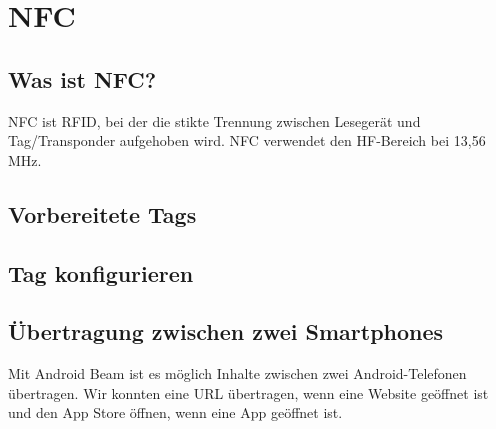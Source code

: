 \documentclass[a4paper,12pt,headsepline,footsepline]{scrartcl}
\begin{document}
\section{NFC}

\subsection{Was ist NFC?}

NFC ist RFID, bei der die stikte Trennung zwischen Lesegerät und Tag/Transponder aufgehoben wird.
NFC verwendet den HF-Bereich bei 13,56 MHz.

\subsection{Vorbereitete Tags}

\subsection{Tag konfigurieren}

\subsection{Übertragung zwischen zwei Smartphones}

Mit Android Beam ist es möglich Inhalte zwischen zwei Android-Telefonen übertragen.
Wir konnten eine URL übertragen, wenn eine Website geöffnet ist und den App Store
öffnen, wenn eine App geöffnet ist.
\end{document}
